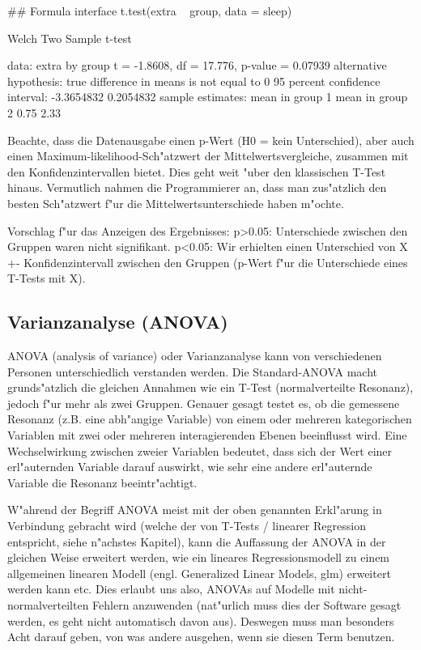 \documentclass[a4paper,twoside]{tufte-book}\usepackage[]{graphicx}\usepackage[]{color}
\begin{document}
\begin{Schunk}
\begin{Sinput}
## Formula interface
t.test(extra ~ group, data = sleep)
\end{Sinput}
\begin{Soutput}

	Welch Two Sample t-test

data:  extra by group
t = -1.8608, df = 17.776, p-value = 0.07939
alternative hypothesis: true difference in means is not equal to 0
95 percent confidence interval:
 -3.3654832  0.2054832
sample estimates:
mean in group 1 mean in group 2 
           0.75            2.33 
\end{Soutput}
\end{Schunk}

Beachte, dass die Datenausgabe einen p-Wert (H0 = kein Unterschied), aber auch einen Maximum-likelihood-Sch"atzwert der Mittelwertsvergleiche, zusammen mit den Konfidenzintervallen bietet. Dies geht weit "uber den klassischen T-Test hinaus. Vermutlich nahmen die Programmierer an, dass man zus"atzlich den besten Sch"atzwert f"ur die Mittelwertsunterschiede haben m"ochte.

Vorschlag f"ur das Anzeigen des Ergebnisses: p>0.05: Unterschiede zwischen den Gruppen waren nicht signifikant. p<0.05: Wir erhielten einen Unterschied von X +- Konfidenzintervall zwischen den Gruppen (p-Wert f"ur die Unterschiede eines T-Tests mit X). 

\subsection{Varianzanalyse (ANOVA)}

ANOVA (analysis of variance) oder Varianzanalyse kann von verschiedenen Personen unterschiedlich verstanden werden. Die Standard-ANOVA macht grunds"atzlich die gleichen Annahmen wie ein T-Test (normalverteilte Resonanz), jedoch f"ur mehr als zwei Gruppen. Genauer gesagt testet es, ob die gemessene Resonanz (z.B. eine abh"angige Variable) von einem oder mehreren kategorischen Variablen mit zwei oder mehreren interagierenden Ebenen beeinflusst wird. Eine Wechselwirkung zwischen zweier Variablen bedeutet, dass sich der Wert einer erl"auternden Variable darauf auswirkt, wie sehr eine andere erl"auternde Variable die Resonanz beeintr"achtigt.

W"ahrend der Begriff ANOVA meist mit der oben genannten Erkl"arung in Verbindung gebracht wird (welche der von T-Tests / linearer Regression entspricht, siehe n"achstes Kapitel), kann die Auffassung der ANOVA in der gleichen Weise erweitert werden, wie ein lineares Regressionsmodell zu einem allgemeinen linearen Modell (engl. Generalized Linear Models, glm) erweitert werden kann etc. Dies erlaubt uns also, ANOVAs auf Modelle mit nicht-normalverteilten Fehlern anzuwenden (nat"urlich muss dies der Software gesagt werden, es geht nicht automatisch davon aus). Deswegen muss man besonders Acht darauf geben, von was andere ausgehen, wenn sie diesen Term benutzen.
\end{document}
